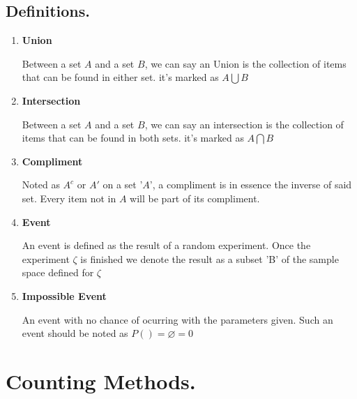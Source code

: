 \documentclass[11pt,fleqn]{book} %
\begin{document}
\section{Definitions.}
\begin{enumerate}
    \item \textbf{Union}
    
    Between a set $ A $ and a set $ B $, we can say an Union is the collection of items that can be found in
    either set. it's marked as $ A \bigcup  B $


    \item \textbf{Intersection}

    Between a set $ A $ and a set $ B $, we can say an intersection is the collection of items that can be found in
    both sets. it's marked as $ A \bigcap  B $

    \item \textbf{Compliment}
    
    Noted as $ A^c $ or $ A' $ on a set '$ A $', a compliment is in essence the inverse 
    of said set. Every item not in $ A $ will be part of its compliment.
    
    \item \textbf{Event}
    
    An event is defined as the result of a random experiment. Once the experiment $ \zeta $
    is finished we denote the result as a subset 'B' of the sample space defined for $ \zeta $

    \item \textbf{Impossible Event}
    
    An event with no chance of ocurring with the parameters given. Such an event should be
    noted as $P() = \varnothing = 0 $
\end{enumerate}

\chapter{Counting Methods.}







\end{document}
